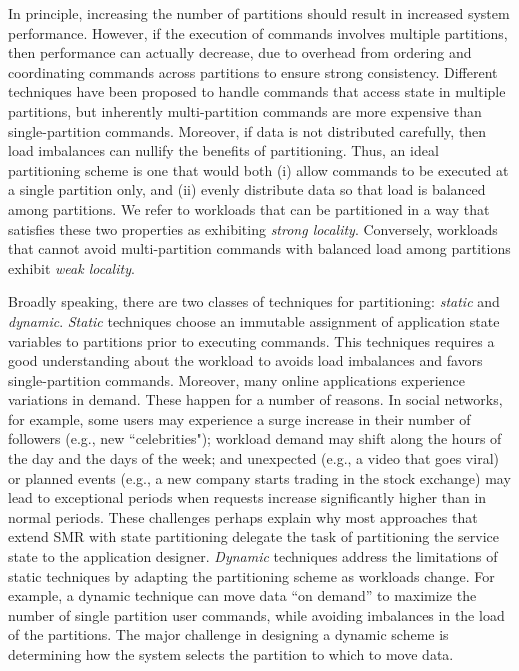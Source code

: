 In principle, increasing the number of partitions should result in increased
system performance. However, if the execution of commands involves multiple
partitions, then performance can actually decrease, due to overhead from
ordering and coordinating commands across partitions to ensure strong
consistency. Different techniques have been proposed to handle commands that
access state in multiple partitions, but inherently multi-partition commands are
more expensive than single-partition commands. Moreover, if data is not
distributed carefully, then load imbalances can nullify the benefits of
partitioning. Thus, an ideal partitioning scheme is one that would both (i)
allow commands to be executed at a single partition only, and (ii) evenly
distribute data so that load is balanced among partitions. We refer to workloads
that can be partitioned in a way that satisfies these two properties as
exhibiting \emph{strong locality}. Conversely, workloads that cannot avoid
multi-partition commands with balanced load among partitions exhibit \emph{weak
locality}.

Broadly speaking, there are two classes of techniques for partitioning:
\emph{static} and \emph{dynamic}. \emph{Static} techniques choose an immutable
assignment of application state variables to partitions prior to executing
commands. This techniques requires a good understanding about the workload to
avoids load imbalances and favors single-partition commands.  Moreover, many
online applications experience variations in demand. These happen for a number
of reasons. In social networks, for example, some users may experience a surge
increase in their number of followers (e.g., new ``celebrities"); workload
demand may shift along the hours of the day and the days of the week; and
unexpected (e.g., a video that goes viral) or planned events (e.g., a new
company starts trading in the stock exchange) may lead to exceptional periods
when requests increase significantly higher than in normal periods. These
challenges perhaps explain why most approaches that extend SMR with state
partitioning delegate the task of partitioning the service state to the
application designer. \emph{Dynamic} techniques address the limitations of static
techniques by adapting the partitioning scheme as workloads change. For example,
a dynamic technique can move data ``on demand'' to maximize the number of single
partition user commands, while avoiding imbalances in the load of the
partitions.
The major challenge in designing a dynamic scheme is determining how the system
selects the partition to which to move data.


